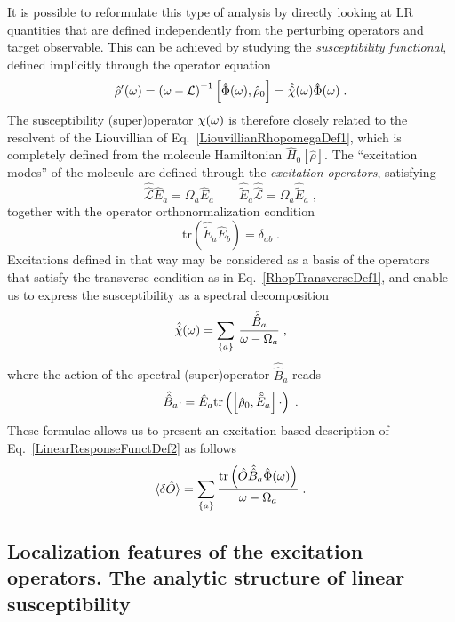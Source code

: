 \documentclass[reprint,aps,prb]{revtex4-1}
\newcommand{\be}{\begin{equation}}
\newcommand{\ee}{\end{equation}}
\newcommand{\nn}{\notag}
\newcommand{\qq}{\qquad}
\newcommand{\lb}{\label}
\newcommand{\op}[1]{\hat {#1}}
\newcommand{\sop}[1]{\op{\op {#1}}}
\newcommand{\commutator}[2]{\left[ {#1} , {#2} \right]}
\newcommand{\trace}[1]{\mathrm{tr}\left(#1\right)}
\newcommand{\dmnot}{\op{\rho}_0}
\newcommand{\dm}{\op{\rho}}
\newcommand{\hnot}{\op{H}_0}
\newcommand{\Liouv}{\sop{\mathcal L}}
\begin{document}
It is possible to reformulate this type of analysis by directly looking at LR quantities that are defined independently from the perturbing operators and target observable. This can be achieved by studying the \emph{susceptibility functional}, defined implicitly through the operator equation
\be\lb{SusceptibilityDef1}
\dm'(\omega) = \left(\omega -\mathcal L \right)^{-1} \commutator{\op \Phi(\omega)}{\dmnot} = \sop{{\cal \chi}}(\omega) \op\Phi(\omega) \;.
\ee
The susceptibility (super)operator $\cal \chi(\omega)$ is therefore closely related to the resolvent of the Liouvillian of Eq.~\eqref{LiouvillianRhopomegaDef1}, which is completely defined
from the molecule Hamiltonian $\hnot[\dm]$.
The ``excitation modes''  of the molecule are defined through the \emph{excitation operators}, satisfying
\be\lb{ExcitationOperatorsDef1}
\Liouv \op E_a = \Omega_a \op E_a \qq \op{\tilde E}_a \Liouv = \Omega_a \op{\tilde E}_a \;,
\ee
together with the operator orthonormalization condition %
\be\lb{orthoExcitatioOpDef1}
\trace{\op{\tilde E}_a\op E_b} = \delta_{ab} \;.
\ee
Excitations defined in that way may be considered as a basis of the operators that satisfy the transverse condition as in
Eq.~\eqref{RhopTransverseDef1}, and enable us to express the susceptibility as a spectral decomposition
\be\lb{RhopExcitationDef1}
\sop{{\cal \chi}}(\omega) = \sum_{\{a\}} \,
\frac{\sop B_a}{\omega-\Omega_a} \;,
\ee
where the action of the spectral (super)operator $\sop B_a$ reads
\be\lb{spectralop}
  \sop B_a \cdot = \op E_a \trace{\commutator{\dmnot}{\op{\tilde E}_a} \cdot} \;. \nn
\ee
These formulae allows us to present an excitation-based description of Eq.~\eqref{LinearResponseFunctDef2} as follows
\be\lb{deltaoexc}
  \braket{\delta \op O} =  \sum_{\{a\}} \frac{\trace{\op O \sop B_a \op \Phi(\omega)}}{\omega -\Omega_a}\;.
\ee

\subsection{Localization features of the excitation operators. The analytic structure of linear susceptibility}
\end{document}
